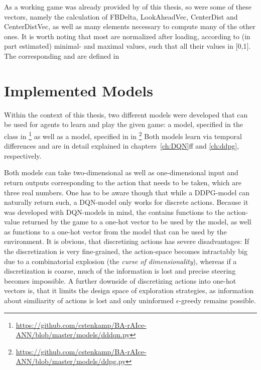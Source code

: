 As a working game was already provided by \leon of this thesis, so were some of these vectors, namely the calculation of FBDelta, LookAheadVec, CenterDist and CenterDistVec, as well as many elements necessary to compute many of the other ones. 
It is worth noting that most  are normalized after loading, according to (in part estimated) minimal- and maximal values, such that all their values in [0,1]. The corresponding  and  are defined in 

\section{Implemented Models}

Within the context of this thesis, two different models were developed that can be used for agents to learn and play the given game: a  model, specified in the class  in \footnote{\url{https://github.com/cstenkamp/BA-rAIce-ANN/blob/master/models/dddqn.py}} as well as a  model, specified in  in \footnote{\url{https://github.com/cstenkamp/BA-rAIce-ANN/blob/master/models/ddpg.py}} Both models learn via temporal differences and are in detail explained in chapters~\ref{ch:DQN}ff and \ref{ch:ddpg}, respectively. 

Both models can take two-dimensional as well as one-dimensional input and return outputs corresponding to the action that needs to be taken, which are three real numbers. One has to be aware though that while a DDPG-model can naturally return such, a DQN-model only works for discrete actions. Because it was developed with DQN-models in mind, the  contains functions to  the action-value returned by the game to a one-hot vector to be used by the model, as well as functions to  a one-hot vector from the model that can be used by the environment. It is obvious, that discretizing actions has severe disadvantages: If the discretization is very fine-grained, the action-space becomes intractably big due to a combinatorial explosion (the \textit{curse of dimensionality}), whereas if a discretization is coarse, much of the information is lost and precise steering becomes impossible. A further downside of discretizing actions into one-hot vectors is, that it limits the design space of exploration strategies, as information about similiarity of actions is lost and only uninformed $\epsilon$-greedy remains possible.

